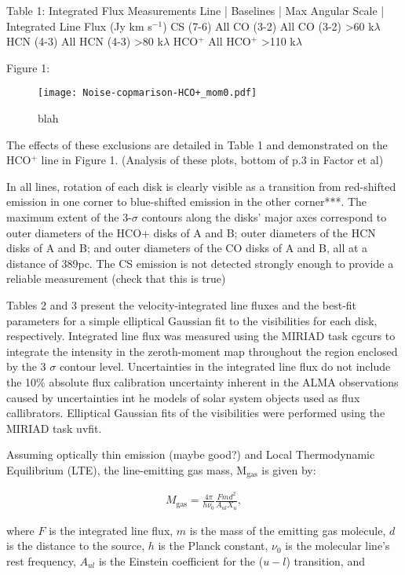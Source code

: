 Table 1: Integrated Flux Measurements
Line       | Baselines                   | Max Angular Scale | Integrated Line Flux (Jy km s$^{-1}$)
CS (7-6)    All
CO (3-2)    All
CO (3-2)    \textgreater 60 k$\lambda$
HCN (4-3)   All
HCN (4-3)   \textgreater 80 k$\lambda$
HCO$^{+}$   All
HCO$^{+}$   \textgreater 110 k$\lambda$


Figure 1:

\begin{figure}
  \centering
  \texttt{[image: Noise-copmarison-HCO+\_mom0.pdf]}
  \caption{blah}
\end{figure}

The effects of these exclusions are detailed in Table 1 and demonstrated on the HCO$^{+}$ line in Figure 1. (Analysis of these plots, bottom of p.3 in Factor et al)


In all lines, rotation of each disk is clearly visible as a transition from red-shifted emission in one corner to blue-shifted emission in the other corner***. The maximum extent of the 3-$\sigma$ contours along the disks' major axes correspond to outer diameters of the HCO+ disks of A and B; outer diameters of the HCN disks of A and B; and outer diameters of the CO disks of A and B, all at a distance of 389pc. The CS emission is not detected strongly enough to provide a reliable measurement (check that this is true)

Tables 2 and 3 present the velocity-integrated line fluxes and the best-fit parameters for a simple elliptical Gaussian fit to the visibilities for each disk, respectively. Integrated line flux was measured using the MIRIAD task cgcurs to integrate the intensity in the zeroth-moment map throughout the region enclosed by the 3 $\sigma$ contour level. Uncertainties in the integrated line flux do not include the 10\% absolute flux calibration uncertainty inherent in the ALMA observations caused by uncertainties int he models of solar system objects used as flux callibrators. Elliptical Gaussian fits of the visibilities were performed using the MIRIAD task uvfit.

Assuming optically thin emission (maybe good?) and Local Thermodynamic Equilibrium (LTE), the line-emitting gas mass, M$_{\text{gas}}$ is given by:

\begin{align}
  M_{\text{gas}}= \frac{4 \pi}{h \nu_0} \frac{F m d^2}{A_{ul} X_u},
\end{align}

where $F$ is the integrated line flux, $m$ is the mass of the emitting gas molecule, $d$ is the distance to the source, $h$ is the Planck constant, $\nu_0$ is the molecular line's rest frequency, $A_{ul}$ is the Einstein coefficient for the ($u - l$) transition, and

